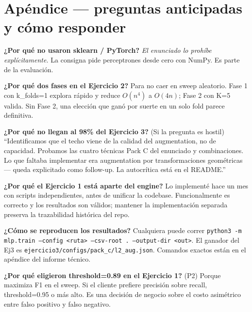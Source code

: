 \documentclass[11pt,a4paper]{article}
\newcommand{\code}[1]{\texttt{\textcolor{accent}{#1}}}
\newcommand{\file}[1]{\texttt{\small #1}}
\newcommand{\enunciado}[1]{\textcolor{warn}{\textit{#1}}}
\begin{document}
\section*{Apéndice — preguntas anticipadas y cómo responder}

\begin{cue}
\textbf{¿Por qué no usaron sklearn / PyTorch?} \enunciado{El enunciado lo prohíbe explícitamente.} La consigna pide perceptrones desde cero con NumPy. Es parte de la evaluación.
\end{cue}

\begin{cue}
\textbf{¿Por qué dos fases en el Ejercicio 2?} Para no caer en sweep aleatorio. Fase 1 con k\_folds=1 explora rápido y reduce $O(n^4)$ a $O(4n)$; Fase 2 con K=5 valida. Sin Fase 2, una elección que ganó por suerte en un solo fold parece definitiva.
\end{cue}

\begin{cue}
\textbf{¿Por qué no llegan al 98\% del Ejercicio 3?} (Si la pregunta es hostil) ``Identificamos que el techo viene de la calidad del augmentation, no de capacidad. Probamos las cuatro técnicas Pack C del enunciado y combinaciones. Lo que faltaba implementar era augmentation por transformaciones geométricas --- queda explicitado como follow-up. La autocrítica está en el README.''
\end{cue}

\begin{cue}
\textbf{¿Por qué el Ejercicio 1 está aparte del engine?} Lo implementé hace un mes con scripts independientes, antes de unificar la codebase. Funcionalmente es correcto y los resultados son válidos; mantener la implementación separada preserva la trazabilidad histórica del repo.
\end{cue}

\begin{cue}
\textbf{¿Cómo se reproducen los resultados?} Cualquiera puede correr \code{python3 -m mlp.train --config \textless ruta\textgreater\ --csv-root . --output-dir \textless out\textgreater}. El ganador del Ej3 es \file{ejercicio3/configs/pack\_c/l2\_aug.json}. Comandos exactos están en el apéndice del informe técnico.
\end{cue}

\begin{cue}
\textbf{¿Por qué eligieron threshold=0.89 en el Ejercicio 1?} (P2) Porque maximiza F1 en el sweep. Si el cliente prefiere precisión sobre recall, threshold=0.95 o más alto. Es una decisión de negocio sobre el costo asimétrico entre falso positivo y falso negativo.
\end{cue}
\end{document}
